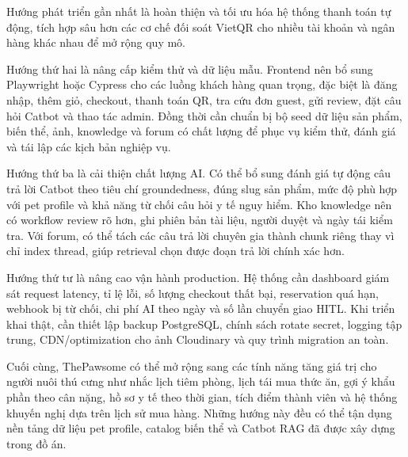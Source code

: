 \documentclass[../DoAn.tex]{subfiles}
\begin{document}
Hướng phát triển gần nhất là hoàn thiện và tối ưu hóa hệ thống thanh toán tự động, tích hợp sâu hơn các cơ chế đối soát VietQR cho nhiều tài khoản và ngân hàng khác nhau để mở rộng quy mô.

Hướng thứ hai là nâng cấp kiểm thử và dữ liệu mẫu. Frontend nên bổ sung Playwright hoặc Cypress cho các luồng khách hàng quan trọng, đặc biệt là đăng nhập, thêm giỏ, checkout, thanh toán QR, tra cứu đơn guest, gửi review, đặt câu hỏi Catbot và thao tác admin. Đồng thời cần chuẩn bị bộ seed dữ liệu sản phẩm, biến thể, ảnh, knowledge và forum có chất lượng để phục vụ kiểm thử, đánh giá và tái lập các kịch bản nghiệp vụ.

Hướng thứ ba là cải thiện chất lượng AI. Có thể bổ sung đánh giá tự động câu trả lời Catbot theo tiêu chí groundedness, đúng slug sản phẩm, mức độ phù hợp với pet profile và khả năng từ chối câu hỏi y tế nguy hiểm. Kho knowledge nên có workflow review rõ hơn, ghi phiên bản tài liệu, người duyệt và ngày tái kiểm tra. Với forum, có thể tách các câu trả lời chuyên gia thành chunk riêng thay vì chỉ index thread, giúp retrieval chọn được đoạn trả lời chính xác hơn.

Hướng thứ tư là nâng cao vận hành production. Hệ thống cần dashboard giám sát request latency, tỉ lệ lỗi, số lượng checkout thất bại, reservation quá hạn, webhook bị từ chối, chi phí AI theo ngày và số lần chuyển giao HITL. Khi triển khai thật, cần thiết lập backup PostgreSQL, chính sách rotate secret, logging tập trung, CDN/optimization cho ảnh Cloudinary và quy trình migration an toàn.

Cuối cùng, ThePawsome có thể mở rộng sang các tính năng tăng giá trị cho người nuôi thú cưng như nhắc lịch tiêm phòng, lịch tái mua thức ăn, gợi ý khẩu phần theo cân nặng, hồ sơ y tế theo thời gian, tích điểm thành viên và hệ thống khuyến nghị dựa trên lịch sử mua hàng. Những hướng này đều có thể tận dụng nền tảng dữ liệu pet profile, catalog biến thể và Catbot RAG đã được xây dựng trong đồ án.
\end{document}
